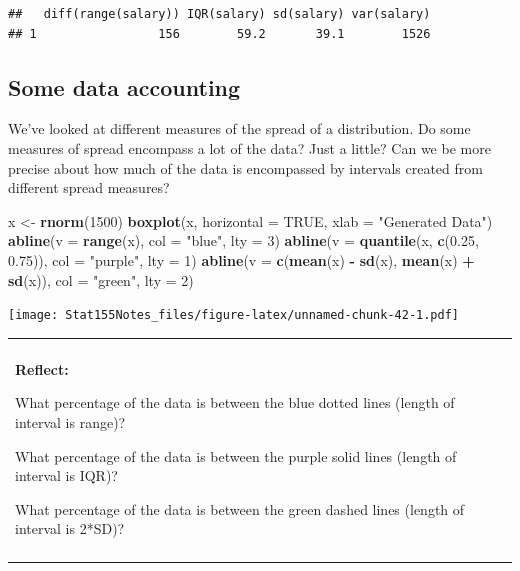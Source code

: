 \documentclass[]{book}
\newenvironment{Shaded}{\begin{snugshade}}{\end{snugshade}}
\newcommand{\DataTypeTok}[1]{\textcolor[rgb]{0.13,0.29,0.53}{#1}}
\newcommand{\DecValTok}[1]{\textcolor[rgb]{0.00,0.00,0.81}{#1}}
\newcommand{\FloatTok}[1]{\textcolor[rgb]{0.00,0.00,0.81}{#1}}
\newcommand{\KeywordTok}[1]{\textcolor[rgb]{0.13,0.29,0.53}{\textbf{#1}}}
\newcommand{\NormalTok}[1]{#1}
\newcommand{\OperatorTok}[1]{\textcolor[rgb]{0.81,0.36,0.00}{\textbf{#1}}}
\newcommand{\OtherTok}[1]{\textcolor[rgb]{0.56,0.35,0.01}{#1}}
\newcommand{\StringTok}[1]{\textcolor[rgb]{0.31,0.60,0.02}{#1}}
\newenvironment{reflect}
{
    \begin{center}
    
    \begin{tabular}{|p{0.8\textwidth}|}
    \rowcolor{LightBlue}
    \hline\\
    \rowcolor{LightBlue}
    \textbf{Reflect:}
}
{
    \\\rowcolor{LightBlue}
    \\\hline
    \end{tabular} 
    \end{center}
}
\begin{document}
\begin{verbatim}
##   diff(range(salary)) IQR(salary) sd(salary) var(salary)
## 1                 156        59.2       39.1        1526
\end{verbatim}

\hypertarget{intro-zscore}{%
\subsection{Some data accounting}\label{intro-zscore}}

We've looked at different measures of the spread of a distribution. Do some measures of spread encompass a lot of the data? Just a little? Can we be more precise about how much of the data is encompassed by intervals created from different spread measures?

\begin{Shaded}
\begin{Highlighting}[]
\NormalTok{x <-}\StringTok{ }\KeywordTok{rnorm}\NormalTok{(}\DecValTok{1500}\NormalTok{)}
\KeywordTok{boxplot}\NormalTok{(x, }\DataTypeTok{horizontal =} \OtherTok{TRUE}\NormalTok{, }\DataTypeTok{xlab =} \StringTok{"Generated Data"}\NormalTok{)}
\KeywordTok{abline}\NormalTok{(}\DataTypeTok{v =} \KeywordTok{range}\NormalTok{(x), }\DataTypeTok{col =} \StringTok{"blue"}\NormalTok{, }\DataTypeTok{lty =} \DecValTok{3}\NormalTok{)}
\KeywordTok{abline}\NormalTok{(}\DataTypeTok{v =} \KeywordTok{quantile}\NormalTok{(x, }\KeywordTok{c}\NormalTok{(}\FloatTok{0.25}\NormalTok{, }\FloatTok{0.75}\NormalTok{)), }\DataTypeTok{col =} \StringTok{"purple"}\NormalTok{, }\DataTypeTok{lty =} \DecValTok{1}\NormalTok{)}
\KeywordTok{abline}\NormalTok{(}\DataTypeTok{v =} \KeywordTok{c}\NormalTok{(}\KeywordTok{mean}\NormalTok{(x) }\OperatorTok{-}\StringTok{ }\KeywordTok{sd}\NormalTok{(x), }\KeywordTok{mean}\NormalTok{(x) }\OperatorTok{+}\StringTok{ }\KeywordTok{sd}\NormalTok{(x)), }\DataTypeTok{col =} \StringTok{"green"}\NormalTok{, }\DataTypeTok{lty =} \DecValTok{2}\NormalTok{)}
\end{Highlighting}
\end{Shaded}

\texttt{[image: Stat155Notes\_files/figure-latex/unnamed-chunk-42-1.pdf]}

\begin{reflect}
What percentage of the data is between the blue dotted lines (length of
interval is range)?

What percentage of the data is between the purple solid lines (length of
interval is IQR)?

What percentage of the data is between the green dashed lines (length of
interval is 2*SD)?
\end{reflect}
\end{document}
